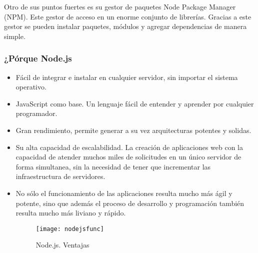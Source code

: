 

Otro de sus puntos fuertes es su gestor de paquetes Node Package Manager (NPM). Este gestor de acceso en un enorme conjunto de librerías. Gracias a este gestor se pueden instalar paquetes, módulos y agregar dependencias de manera simple.


\subsubsection{¿Pórque Node.js}
\begin{itemize}
	\item Fácil de integrar e instalar en cualquier servidor, sin importar el sistema operativo.
	\item JavaScript como base. Un lenguaje fácil de entender y aprender por cualquier programador.
	\item Gran rendimiento, permite generar a su vez arquitecturas potentes y solidas.
	\item Su alta capacidad de escalabilidad. La creación de aplicaciones web con la capacidad de atender muchos miles de solicitudes en un único servidor de forma simultanea, sin la necesidad de tener que incrementar las infraestructura de servidores.
	\item No sólo el funcionamiento de las aplicaciones resulta mucho más ágil y potente, sino que además el proceso de desarrollo y programación también resulta mucho más liviano y rápido.
		
	\begin{figure}[h]
		\centering
		\texttt{[image: nodejsfunc]}
		\caption{Node.js. Ventajas }
		\label{fig:nodejs}
	\end{figure}
\end{itemize}



